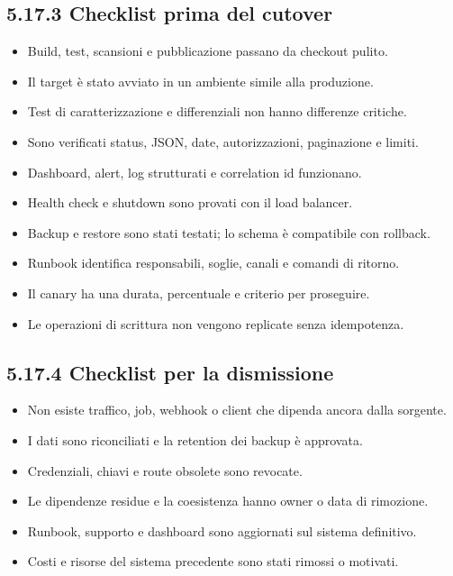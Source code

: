 \documentclass[
  italian,
  10pt,
]{book}
\providecommand{\tightlist}{%
  \setlength{\itemsep}{0pt}\setlength{\parskip}{0pt}}
\begin{document}
\subsection{5.17.3 Checklist prima del
cutover}\label{checklist-prima-del-cutover}

\begin{itemize}
\tightlist
\item[$\square$]
  Build, test, scansioni e pubblicazione passano da checkout pulito.
\item[$\square$]
  Il target è stato avviato in un ambiente simile alla produzione.
\item[$\square$]
  Test di caratterizzazione e differenziali non hanno differenze
  critiche.
\item[$\square$]
  Sono verificati status, JSON, date, autorizzazioni, paginazione e
  limiti.
\item[$\square$]
  Dashboard, alert, log strutturati e correlation id funzionano.
\item[$\square$]
  Health check e shutdown sono provati con il load balancer.
\item[$\square$]
  Backup e restore sono stati testati; lo schema è compatibile con
  rollback.
\item[$\square$]
  Runbook identifica responsabili, soglie, canali e comandi di ritorno.
\item[$\square$]
  Il canary ha una durata, percentuale e criterio per proseguire.
\item[$\square$]
  Le operazioni di scrittura non vengono replicate senza idempotenza.
\end{itemize}

\subsection{5.17.4 Checklist per la
dismissione}\label{checklist-per-la-dismissione}

\begin{itemize}
\tightlist
\item[$\square$]
  Non esiste traffico, job, webhook o client che dipenda ancora dalla
  sorgente.
\item[$\square$]
  I dati sono riconciliati e la retention dei backup è approvata.
\item[$\square$]
  Credenziali, chiavi e route obsolete sono revocate.
\item[$\square$]
  Le dipendenze residue e la coesistenza hanno owner o data di
  rimozione.
\item[$\square$]
  Runbook, supporto e dashboard sono aggiornati sul sistema definitivo.
\item[$\square$]
  Costi e risorse del sistema precedente sono stati rimossi o motivati.
\end{itemize}
\end{document}
